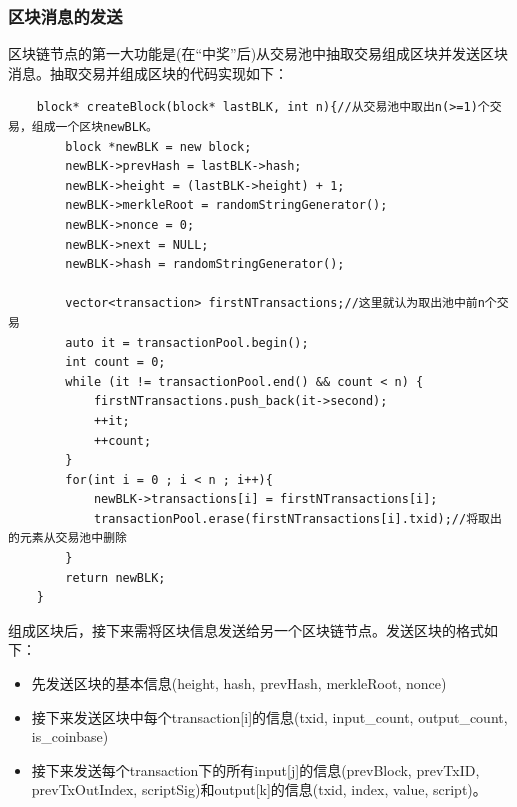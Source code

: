 \documentclass[10pt,a4paper]{article}
\begin{document}
    \subsubsection{区块消息的发送}
    区块链节点的第一大功能是(在“中奖”后)从交易池中抽取交易组成区块并发送区块消息。抽取交易并组成区块的代码实现如下：
    \begin{verbatim}
    block* createBlock(block* lastBLK, int n){//从交易池中取出n(>=1)个交易，组成一个区块newBLK。
        block *newBLK = new block;
        newBLK->prevHash = lastBLK->hash;
        newBLK->height = (lastBLK->height) + 1;
        newBLK->merkleRoot = randomStringGenerator();
        newBLK->nonce = 0;
        newBLK->next = NULL;
        newBLK->hash = randomStringGenerator();
    
        vector<transaction> firstNTransactions;//这里就认为取出池中前n个交易
        auto it = transactionPool.begin();
        int count = 0;
        while (it != transactionPool.end() && count < n) {
            firstNTransactions.push_back(it->second);
            ++it;
            ++count;
        }
        for(int i = 0 ; i < n ; i++){
            newBLK->transactions[i] = firstNTransactions[i];
            transactionPool.erase(firstNTransactions[i].txid);//将取出的元素从交易池中删除
        }
        return newBLK;
    }
    \end{verbatim}
    组成区块后，接下来需将区块信息发送给另一个区块链节点。发送区块的格式如下：
    \begin{itemize}
        \item 先发送区块的基本信息(height, hash, prevHash, merkleRoot, nonce)
        \item 接下来发送区块中每个transaction[i]的信息(txid, input\_count, output\_count, is\_coinbase)
        \item 接下来发送每个transaction下的所有input[j]的信息(prevBlock, prevTxID, prevTxOutIndex, scriptSig)和output[k]的信息(txid, index, value, script)。
    \end{itemize}
\end{document}
